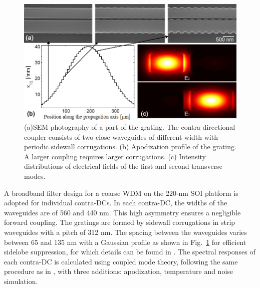 \documentclass[osajnl,twocolumn,showpacs,superscriptaddress,10pt]{revtex4-1}
\newcommand*\diff{\mathop{}\!\mathrm{d}}
\begin{document}
\begin{figure}[htbp]
  \centering
  \includegraphics[width=1\columnwidth]{data/FigApod}
  \caption{(a)SEM photography of a part of the grating. The contra-directional coupler consists of two close waveguides of different width with periodic sidewall corrugations. (b) Apodization profile of the grating. A larger coupling requires larger corrugations. (c) Intensity distributions of electrical fields of the first and second transverse modes. }
  \label{fig:SEM}
\end{figure} 


A broadband filter design for a coarse WDM on the 220-nm SOI platform \cite{shi2013siliconCWDM} is adopted for individual contra-DCs.  
In each contra-DC, the widths of the waveguides are of 560 and 440 nm.
This high asymmetry ensures a negligible forward coupling. 
The gratings are formed by sidewall corrugations in strip waveguides with a pitch of 312 nm. 
The spacing between the waveguides varies between 65 and 135 nm with a Gaussian profile as shown in Fig.~\ref{fig:SEM} for efficient sidelobe suppression, for which details can be found in \cite{shi2013siliconCWDM}.
The spectral responses of each contra-DC is calculated using coupled mode theory, following the same procedure as in  \cite{shi2013siliconContraDC}, with three additions: apodization, temperature and noise simulation.

\end{document}
